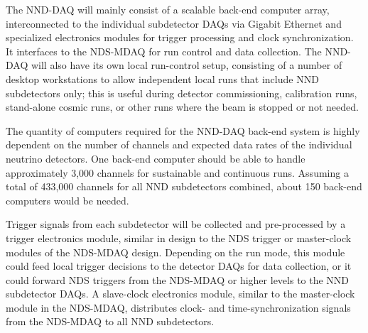 The NND-DAQ will mainly consist of a scalable back-end computer array,
interconnected to the individual subdetector DAQs via Gigabit
Ethernet and specialized electronics modules for trigger processing
and clock synchronization. It interfaces to the NDS-MDAQ for run
control and data collection. The NND-DAQ will also have its own local
run-control setup, consisting of a number of desktop workstations to
allow independent local runs that include NND subdetectors only; this
is useful during detector commissioning, calibration runs, stand-alone
cosmic runs, or other runs where the beam is stopped or not needed.

The quantity of computers required for the NND-DAQ back-end system is
highly dependent on the number of channels and expected data rates of
the individual neutrino detectors.  One back-end computer should be
able to handle approximately 3,000 channels for sustainable and
continuous runs. Assuming a total of 433,000 channels for all NND
subdetectors combined, about 150 back-end computers would be needed.

Trigger signals from each subdetector will be collected and
pre-processed by a trigger electronics module, similar in design to
the NDS trigger or master-clock modules of the NDS-MDAQ
design. Depending on the run mode, this module could feed local
trigger decisions to the detector DAQs for data collection, or it
could forward NDS triggers from the NDS-MDAQ or higher levels to the
NND subdetector DAQs.  A slave-clock electronics module, similar to
the master-clock module in the NDS-MDAQ, distributes clock- and
time-synchronization signals from the NDS-MDAQ to all NND
subdetectors.

